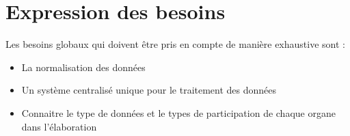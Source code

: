 \chapter{Expression des besoins }

\ifpdf
    \graphicspath{{Chapter3/Figs/Raster/}{Chapter3/Figs/PDF/}{Chapter3/Figs/}}
\else
    \graphicspath{{Chapter3/Figs/Vector/}{Chapter3/Figs/}}
\fi

Les besoins globaux  qui doivent être pris en compte de manière exhaustive sont :
\begin{itemize}
\item La normalisation des données
\item Un système centralisé unique pour le traitement des données	
\item Connaitre le type de données et le types de participation de chaque organe dans l’élaboration 
\end{itemize}
